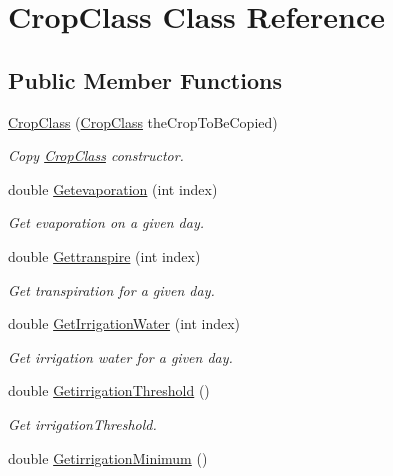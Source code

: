 \hypertarget{class_crop_class}{}\section{Crop\+Class Class Reference}
\label{class_crop_class}
\subsection*{Public Member Functions}
\begin{DoxyCompactItemize}
\item 
\mbox{\hyperlink{class_crop_class_a8e00519cb09b767e943f60c4255c7474}{Crop\+Class}} (\mbox{\hyperlink{class_crop_class}{Crop\+Class}} the\+Crop\+To\+Be\+Copied)
\begin{DoxyCompactList}\small\item\em Copy \mbox{\hyperlink{class_crop_class}{Crop\+Class}} constructor. \end{DoxyCompactList}\item 
double \mbox{\hyperlink{class_crop_class_a9bde6fbfb420275c34f288b872aecd89}{Getevaporation}} (int index)
\begin{DoxyCompactList}\small\item\em Get evaporation on a given day. \end{DoxyCompactList}\item 
double \mbox{\hyperlink{class_crop_class_aaa3b576e74eddfc0e6a4c555885b5764}{Gettranspire}} (int index)
\begin{DoxyCompactList}\small\item\em Get transpiration for a given day. \end{DoxyCompactList}\item 
double \mbox{\hyperlink{class_crop_class_acdf24f6b8427ae6dfad88d6dd8cdd01a}{Get\+Irrigation\+Water}} (int index)
\begin{DoxyCompactList}\small\item\em Get irrigation water for a given day. \end{DoxyCompactList}\item 
double \mbox{\hyperlink{class_crop_class_a394943487b1741dc910a37130f7da65d}{Getirrigation\+Threshold}} ()
\begin{DoxyCompactList}\small\item\em Get irrigation\+Threshold. \end{DoxyCompactList}\item 
double \mbox{\hyperlink{class_crop_class_a50aef2adc5970044b629252000ccdf5f}{Getirrigation\+Minimum}} ()

\end{DoxyCompactItemize}
